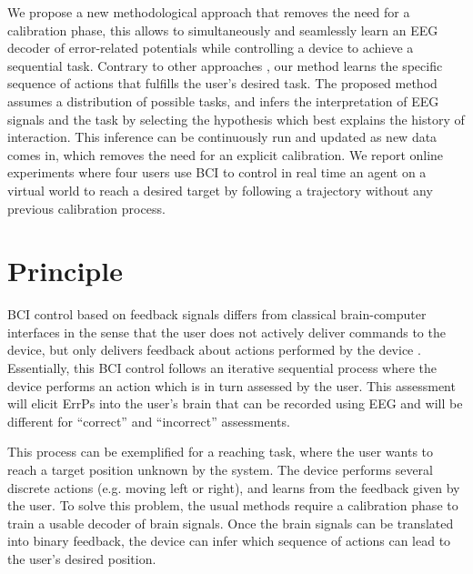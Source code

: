 \documentclass[]{article}
\newcommand{\sectionspace}{\vspace{-0.3cm}}
\begin{document}
We propose a new methodological approach that removes the need for a calibration phase, this allows to simultaneously and seamlessly learn an EEG decoder of error-related potentials while controlling a device to achieve a sequential task. Contrary to other approaches \cite{kindermans2012bayesian}, our method learns the specific sequence of actions that fulfills the user's desired task. The proposed method assumes a distribution of possible tasks, and infers the interpretation of EEG signals and the task by selecting the hypothesis which best explains the history of interaction. This inference can be continuously run and updated as new data comes in, which removes the need for an explicit calibration. We report online experiments where four users use BCI to control in real time an agent on a virtual world to reach a desired target by following a trajectory without any previous calibration process. 


\sectionspace
\section{Principle}
\sectionspace

BCI control based on feedback signals differs from classical brain-computer interfaces in the sense that the user does not actively deliver commands to the device, but only delivers feedback about actions performed by the device \cite{chavarriaga2010learning,iturrate2010single}. Essentially, this BCI control follows an iterative sequential process where the device performs an action which is in turn assessed by the user. This assessment will elicit ErrPs into the user's brain that can be recorded using EEG and will be different for ``correct'' and ``incorrect'' assessments. 

This process can be exemplified for a reaching task, where the user wants to reach a target position unknown by the system. The device performs several discrete actions (e.g. moving left or right), and learns from the feedback given by the user. To solve this problem, the usual methods require a calibration phase to train a usable decoder of brain signals. Once the brain signals can be translated into binary feedback, the device can infer which sequence of actions can lead to the user's desired position. 
\end{document}
